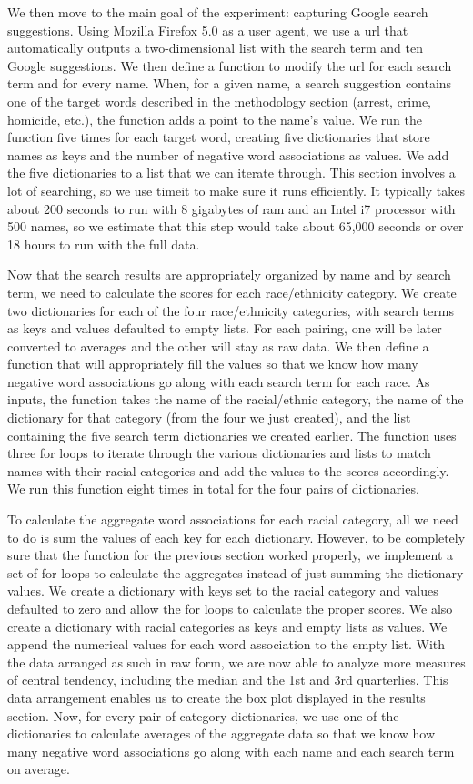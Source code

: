 \documentclass[sigconf]{acmart}
\begin{document}
We then move to the main goal of the experiment: capturing Google search suggestions. Using Mozilla Firefox 5.0 as a user agent, we use a url that automatically outputs a two-dimensional list with the search term and ten Google suggestions. We then define a function to modify the url for each search term and for every name. When, for a given name, a search suggestion contains one of the target words described in the methodology section (arrest, crime, homicide, etc.), the function adds a point to the name's value. We run the function five times for each target word, creating five dictionaries that store names as keys and the number of negative word associations as values. We add the five dictionaries to a list that we can iterate through. This section involves a lot of searching, so we use timeit to make sure it runs efficiently. It typically takes about 200 seconds to run with 8 gigabytes of ram and an Intel i7 processor with 500 names, so we estimate that this step would take about 65,000 seconds or over 18 hours to run with the full data.

Now that the search results are appropriately organized by name and by search term, we need to calculate the scores for each race/ethnicity category. We create two dictionaries for each of the four race/ethnicity categories, with search terms as keys and values defaulted to empty lists. For each pairing, one will be later converted to averages and the other will stay as raw data. We then define a function that will appropriately fill the values so that we know how many negative word associations go along with each search term for each race. As inputs, the function takes the name of the racial/ethnic category, the name of the dictionary for that category (from the four we just created), and the list containing the five search term dictionaries we created earlier. The function uses three for loops to iterate through the various dictionaries and lists to match names with their racial categories and add the values to the scores accordingly. We run this function eight times in total for the four pairs of dictionaries.

To calculate the aggregate word associations for each racial category, all we need to do is sum the values of each key for each dictionary. However, to be completely sure that the function for the previous section worked properly, we implement a set of for loops to calculate the aggregates instead of just summing the dictionary values. We create a dictionary with keys set to the racial category and values defaulted to zero and allow the for loops to calculate the proper scores. We also create a dictionary with racial categories as keys and empty lists as values. We append the numerical values for each word association to the empty list. With the data arranged as such in raw form, we are now able to analyze more measures of central tendency, including the median and the 1st and 3rd quarterlies. This data arrangement enables us to create the box plot displayed in the results section. Now, for every pair of category dictionaries, we use one of the dictionaries to calculate averages of the aggregate data so that we know how many negative word associations go along with each name and each search term on average. 
\end{document}
